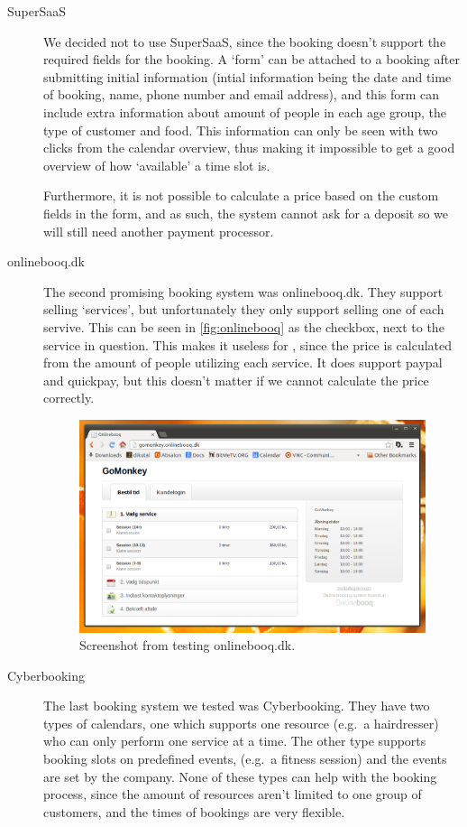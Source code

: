 \begin{description}
\item[SuperSaaS]
We decided not to use SuperSaaS, since the booking doesn’t support the required 
fields for the booking. A `form' can be attached to a booking after submitting 
initial information (intial information being the date and time of booking, 
name, phone number and email address), and this 
form can include extra information about amount of people in each age group, the
type of customer and food. This information can only be seen with two clicks 
from the calendar overview, thus making it impossible to get a good overview of 
how `available' a time slot is.

Furthermore, it is not possible to calculate a price based on the custom fields 
in the form, and as such, the system cannot ask for a deposit so we will still 
need another payment processor.

\item[onlinebooq.dk]
The second promising booking system was onlinebooq.dk. They support selling 
`services', but unfortunately they only support selling one of each servive.
This can be seen in \autoref{fig:onlinebooq} as the checkbox, next to the 
service in question. This makes it useless for \gomonkey{}, since the price is 
calculated from the amount of people utilizing each service. It does support 
paypal and quickpay, but this doesn't matter if we cannot calculate the price 
correctly.

\begin{figure}[htbp]
    \centering
        \includegraphics[width=.8\textwidth]{figures/onlinebooq.png}
	    \caption{Screenshot from testing onlinebooq.dk.}
        \label{fig:onlinebooq}
\end{figure}
		

\item[Cyberbooking]
The last booking system we tested was Cyberbooking. They have two types of 
calendars, one which supports one resource (e.g.\ a hairdresser) who can only
perform one service at a time. The other type supports booking slots on 
predefined events, (e.g.\ a fitness session) and the events are set by the 
company. None of these types can help \gomonkey{} with the booking process,
since the amount of resources aren't limited to one group of customers, and 
the times of bookings are very flexible.
\end{description}

